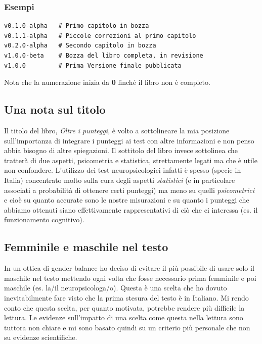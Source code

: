 \documentclass[
  italian,
  letterpaper,
  paper=A4,
  headinclude=on,
  footinclude=on,
  12pt]{scrbook}
\begin{document}
\subsubsection*{Esempi}\label{esempi}

\begin{verbatim}
v0.1.0-alpha   # Primo capitolo in bozza
v0.1.1-alpha   # Piccole correzioni al primo capitolo
v0.2.0-alpha   # Secondo capitolo in bozza
v1.0.0-beta    # Bozza del libro completa, in revisione
v1.0.0         # Prima Versione finale pubblicata
\end{verbatim}

Nota che la numerazione inizia da \textbf{0} finché il libro non è
completo.

\subsection*{Una nota sul titolo}\label{una-nota-sul-titolo}

Il titolo del libro, \emph{Oltre i punteggi}, è volto a sottolineare la
mia posizione sull'importanza di integrare i punteggi ai test con altre
informazioni e non penso abbia bisogno di altre spiegazioni. Il
sottitolo del libro invece sottolinea che tratterà di due aspetti,
psicometria e statistica, strettamente legati ma che è utile non
confondere. L'utilizzo dei test neuropsicologici infatti è spesso
(specie in Italia) concentrato molto sulla cura degli aspetti
\emph{statistici} (e in particolare associati a probabilità di ottenere
certi punteggi) ma meno su quelli \emph{psicometrici} e cioè su quanto
accurate sono le nostre misurazioni e su quanto i punteggi che abbiamo
ottenuti siano effettivamente rappresentativi di ciò che ci interessa
(es. il funzionamento cognitivo).

\subsection*{Femminile e maschile nel
testo}\label{femminile-e-maschile-nel-testo}

In un ottica di gender balance ho deciso di evitare il più possibile di
usare solo il maschile nel testo mettendo ogni volta che fosse
necessario prima femminile e poi maschile (es. la/il neuropsicologa/o).
Questa è una scelta che ho dovuto inevitabilmente fare visto che la
prima stesura del testo è in Italiano. Mi rendo conto che questa scelta,
per quanto motivata, potrebbe rendere più difficile la lettura. Le
evidenze sull'impatto di una scelta come questa nella lettura sono
tuttora non chiare e mi sono basato quindi su un criterio più personale
che non su evidenze scientifiche.
\end{document}
